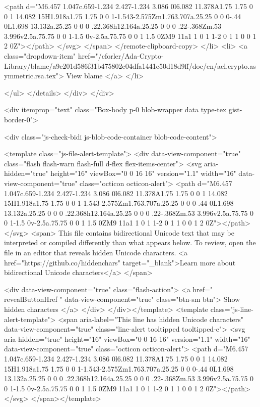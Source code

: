     <path d="M6.457 1.047c.659-1.234 2.427-1.234 3.086 0l6.082 11.378A1.75 1.75 0 0 1 14.082 15H1.918a1.75 1.75 0 0 1-1.543-2.575Zm1.763.707a.25.25 0 0 0-.44 0L1.698 13.132a.25.25 0 0 0 .22.368h12.164a.25.25 0 0 0 .22-.368Zm.53 3.996v2.5a.75.75 0 0 1-1.5 0v-2.5a.75.75 0 0 1 1.5 0ZM9 11a1 1 0 1 1-2 0 1 1 0 0 1 2 0Z"></path>
</svg>
</span>
</remote-clipboard-copy>            </li>
            <li>
              <a class="dropdown-item" href="/cforler/Ada-Crypto-Library/blame/a9c201d586f31b475802e04dfa1441e50d18d9ff/doc/en/acl.crypto.asymmetric.rsa.tex">
                View blame
              </a>
            </li>

        </ul>
      </details>
    </div>
</div>


      
    <div itemprop="text" class="Box-body p-0 blob-wrapper data type-tex  gist-border-0">

        
<div class="js-check-bidi js-blob-code-container blob-code-content">

  <template class="js-file-alert-template">
  <div data-view-component="true" class="flash flash-warn flash-full d-flex flex-items-center">
  <svg aria-hidden="true" height="16" viewBox="0 0 16 16" version="1.1" width="16" data-view-component="true" class="octicon octicon-alert">
    <path d="M6.457 1.047c.659-1.234 2.427-1.234 3.086 0l6.082 11.378A1.75 1.75 0 0 1 14.082 15H1.918a1.75 1.75 0 0 1-1.543-2.575Zm1.763.707a.25.25 0 0 0-.44 0L1.698 13.132a.25.25 0 0 0 .22.368h12.164a.25.25 0 0 0 .22-.368Zm.53 3.996v2.5a.75.75 0 0 1-1.5 0v-2.5a.75.75 0 0 1 1.5 0ZM9 11a1 1 0 1 1-2 0 1 1 0 0 1 2 0Z"></path>
</svg>
    <span>
      This file contains bidirectional Unicode text that may be interpreted or compiled differently than what appears below. To review, open the file in an editor that reveals hidden Unicode characters.
      <a href="https://github.co/hiddenchars" target="_blank">Learn more about bidirectional Unicode characters</a>
    </span>


  <div data-view-component="true" class="flash-action">        <a href="{{ revealButtonHref }}" data-view-component="true" class="btn-sm btn">    Show hidden characters
</a>
</div>
</div></template>
<template class="js-line-alert-template">
  <span aria-label="This line has hidden Unicode characters" data-view-component="true" class="line-alert tooltipped tooltipped-e">
    <svg aria-hidden="true" height="16" viewBox="0 0 16 16" version="1.1" width="16" data-view-component="true" class="octicon octicon-alert">
    <path d="M6.457 1.047c.659-1.234 2.427-1.234 3.086 0l6.082 11.378A1.75 1.75 0 0 1 14.082 15H1.918a1.75 1.75 0 0 1-1.543-2.575Zm1.763.707a.25.25 0 0 0-.44 0L1.698 13.132a.25.25 0 0 0 .22.368h12.164a.25.25 0 0 0 .22-.368Zm.53 3.996v2.5a.75.75 0 0 1-1.5 0v-2.5a.75.75 0 0 1 1.5 0ZM9 11a1 1 0 1 1-2 0 1 1 0 0 1 2 0Z"></path>
</svg>
</span></template>

